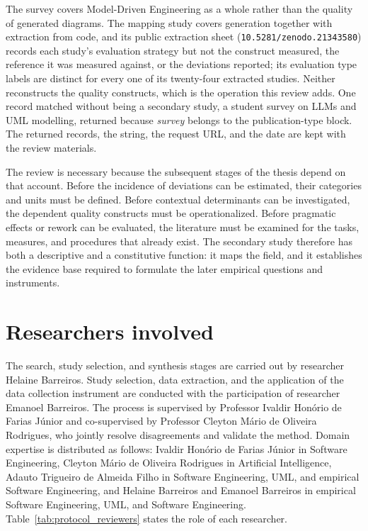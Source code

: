 The survey covers Model-Driven Engineering as a whole rather than the quality of generated diagrams. The mapping study covers generation together with extraction from code, and its public extraction sheet (\texttt{10.5281/zenodo.21343580}) records each study's evaluation strategy but not the construct measured, the reference it was measured against, or the deviations reported; its evaluation type labels are distinct for every one of its twenty-four extracted studies. Neither reconstructs the quality constructs, which is the operation this review adds. One record matched without being a secondary study, a student survey on LLMs and UML modelling, returned because \textit{survey} belongs to the publication-type block. The returned records, the string, the request URL, and the date are kept with the review materials.

The review is necessary because the subsequent stages of the thesis depend on that account. Before the incidence of deviations can be estimated, their categories and units must be defined. Before contextual determinants can be investigated, the dependent quality constructs must be operationalized. Before pragmatic effects or rework can be evaluated, the literature must be examined for the tasks, measures, and procedures that already exist. The secondary study therefore has both a descriptive and a constitutive function: it maps the field, and it establishes the evidence base required to formulate the later empirical questions and instruments.

\section{Researchers involved}
\label{sec:protocol_reviewers}

The search, study selection, and synthesis stages are carried out by researcher Helaine Barreiros. Study selection, data extraction, and the application of the data collection instrument are conducted with the participation of researcher Emanoel Barreiros. The process is supervised by Professor Ivaldir Hon\'orio de Farias J\'unior and co-supervised by Professor Cleyton M\'ario de Oliveira Rodrigues, who jointly resolve disagreements and validate the method. Domain expertise is distributed as follows: Ivaldir Hon\'orio de Farias J\'unior in Software Engineering, Cleyton M\'ario de Oliveira Rodrigues in Artificial Intelligence, Adauto Trigueiro de Almeida Filho in Software Engineering, UML, and empirical Software Engineering, and Helaine Barreiros and Emanoel Barreiros in empirical Software Engineering, UML, and Software Engineering. Table~\ref{tab:protocol_reviewers} states the role of each researcher.

